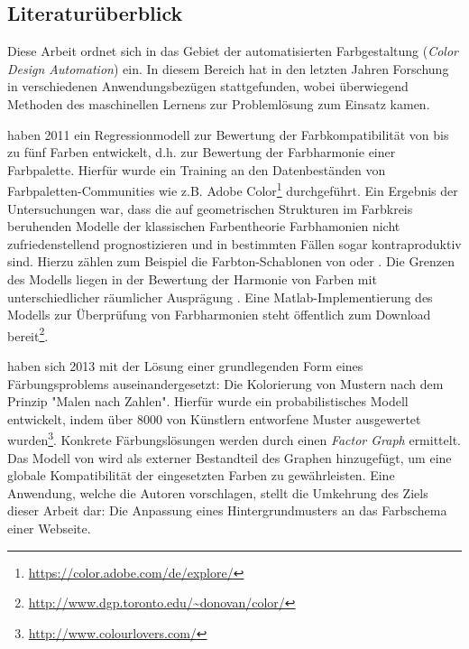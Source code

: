 \subsection{Literaturüberblick}
\label{sec:literatur}

Diese Arbeit ordnet sich in das Gebiet der automatisierten Farbgestaltung (\emph{Color Design Automation}) ein. In diesem Bereich hat in den letzten Jahren Forschung in verschiedenen Anwendungsbezügen stattgefunden, wobei überwiegend Methoden des maschinellen Lernens zur Problemlösung zum Einsatz kamen.

\citet{colorcomp} haben 2011 ein Regressionmodell zur Bewertung der Farbkompatibilität von bis zu fünf Farben entwickelt, d.h. zur Bewertung der Farbharmonie einer Farbpalette. Hierfür wurde ein Training an den Datenbeständen von Farbpaletten-Communities wie z.B. Adobe Color\footnote{\url{https://color.adobe.com/de/explore/}} durchgeführt. Ein Ergebnis der Untersuchungen war, dass die auf geometrischen Strukturen im Farbkreis beruhenden Modelle der klassischen Farbentheorie Farbhamonien nicht zufriedenstellend prognostizieren und in bestimmten Fällen sogar kontraproduktiv sind. Hierzu zählen zum Beispiel die Farbton-Schablonen von \citet{itten} oder \citet{munsell}. Die Grenzen des Modells liegen in der Bewertung der Harmonie von Farben mit unterschiedlicher räumlicher Ausprägung \citep{webpage, patterns}. Eine Matlab-Implementierung des Modells zur Überprüfung von Farbharmonien steht öffentlich zum Download bereit\footnote{\url{http://www.dgp.toronto.edu/~donovan/color/}}.

\citet{patterns} haben sich 2013 mit der Lösung einer grundlegenden Form eines Färbungsproblems auseinandergesetzt: Die Kolorierung von Mustern nach dem Prinzip "Malen nach Zahlen". Hierfür wurde ein probabilistisches Modell entwickelt, indem über 8000 von Künstlern entworfene Muster ausgewertet wurden\footnote{\url{http://www.colourlovers.com/}}. Konkrete Färbungslösungen werden durch einen \emph{Factor Graph} ermittelt. Das Modell von \citet{colorcomp} wird als externer Bestandteil des Graphen hinzugefügt, um eine globale Kompatibilität der eingesetzten Farben zu gewährleisten. Eine Anwendung, welche die Autoren vorschlagen, stellt die Umkehrung des Ziels dieser Arbeit dar: Die Anpassung eines Hintergrundmusters an das Farbschema einer Webseite.

